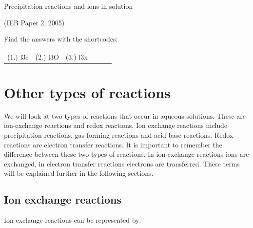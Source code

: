 {{\begin{exercises}{Precipitation reactions and ions in solution }
\begin{enumerate}[noitemsep, label=\textbf{\arabic*}. ]
(IEB Paper 2, 2005)\newline
\end{enumerate}
\practiceinfo
\par {} Find the answers with the shortcodes:
 \par \begin{tabular}[h]{cccccc}
 (1.) l3c  &  (2.) l3O  &  (3.) l3x  & \end{tabular}
\end{exercises}
         \section{Other types of reactions}
    \nopagebreak
            \label{m38719*uid2131}
	We will look at two types of reactions that occur in aqueous solutions. These are ion-exchange reactions and redox reactions. Ion exchange reactions include precipitation reactions, gas forming reactions and acid-base reactions. Redox reactions are electron transfer reactions. It is important to remember the difference between these two types of reactions. In ion exchange reactions ions are exchanged, in electron transfer reactions electrons are transferred. These terms will be explained further in the following sections. 
      \par 
\subsection*{Ion exchange reactions}
      \label{m38719*uid78332}
	Ion exchange reactions can be represented by:
	  \label{m38719*eid071534}\nopagebreak\noindent{}
	    
}}
